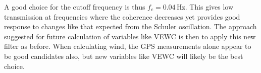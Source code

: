 \documentclass[12pt,twoside,english]{article}\usepackage[]{graphicx}\usepackage[]{color}
\let\OrgIndex\index
\renewcommand*{\index}[1]{\OrgIndex{#1}}
\begin{document}
A good choice for the cutoff frequency is thus $f_c=0.04$\,Hz. This gives low transmission at frequencies where the coherence decreases yet provides good response to changes like that expected from the Schuler oscillation. The approach suggested for future calculation of variables like VEWC is then to apply this new filter as before. When calculating wind, the GPS measurements alone appear to be good candidates also, but new variables like VEWC  will likely be the best choice.


% 
% 
\end{document}
